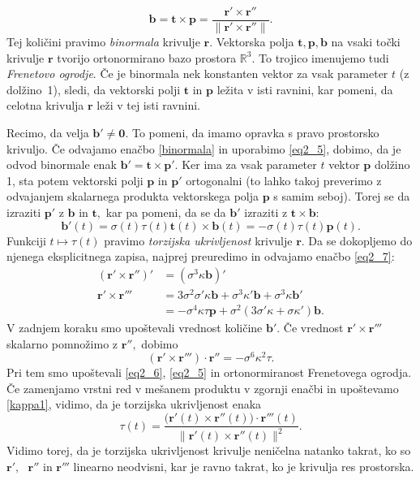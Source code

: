 \documentclass[12pt,a4paper,twoside]{article}
\theoremstyle{definition} %
\theoremstyle{plain} %
\theoremstyle{primerstyle}
\numberwithin{equation}{section}  %
\newcommand{\R}{\mathbb R}
\newcommand{\tV}{\mathbf{t}}
\newcommand{\bV}{\mathbf{b}}
\newcommand{\pV}{\mathbf{p}}
\newcommand{\rV}{\mathbf{r}}
\begin{document}
\begin{equation}
	\label{binormala}
	\bV=\tV \times \pV=\frac{\rV'\times \rV''}{\lVert \rV'\times \rV'' \rVert}.
\end{equation}
Tej količini pravimo \textit{binormala} krivulje $\rV.$ Vektorska polja $\tV,\mathbf{ p}, \mathbf{ b}$ na vsaki točki krivulje $\rV$ tvorijo ortonormirano bazo prostora $\R^3.$ To trojico imenujemo tudi \textit{Frenetovo ogrodje}. Če je binormala nek konstanten vektor za vsak parameter $t$ (z dolžino~1), sledi, da vektorski polji $\tV$ in $\pV$ ležita v isti ravnini, kar pomeni, da celotna krivulja $\rV$ leži v tej isti ravnini.

Recimo, da velja $\bV' \neq \bm{0}.$ To pomeni, da imamo opravka s pravo prostorsko krivuljo. Če odvajamo enačbo \eqref{binormala} in uporabimo \eqref{eq2_5}, dobimo, da je odvod binormale enak $\bV'=\tV \times \pV'.$ Ker ima za vsak parameter $t$ vektor $\pV$ dolžino 1, sta potem vektorski polji $\pV$ in $\pV'$ ortogonalni (to lahko takoj preverimo z odvajanjem skalarnega produkta vektorskega polja $\pV$ s samim seboj). Torej se da izraziti $\pV'$ z $\bV$ in $\tV,$ kar pa pomeni, da se da $\bV'$ izraziti z $\tV \times \bV$:
\begin{equation}
	\label{eq2_11}
	\bV'(t)=\sigma(t)\tau(t)\tV(t)\times \bV(t)=-\sigma(t)\tau(t)\pV(t).
\end{equation}
Funkciji $t\mapsto\tau(t)$ pravimo \textit{torzijska ukrivljenost} krivulje $\rV.$ Da se dokopljemo do njenega eksplicitnega zapisa, najprej preuredimo in odvajamo enačbo \eqref{eq2_7}:
\begin{align*}
	(\rV' \times \rV'')'&=(\sigma^3\kappa \bV)'\\
	\rV' \times \rV''' &= 3\sigma^2\sigma'\kappa\bV+\sigma^3\kappa'\bV+\sigma^3\kappa\bV'\\
	&=-\sigma^4\kappa\tau\pV+\sigma^2(3\sigma'\kappa+\sigma\kappa')\bV.
\end{align*}
V zadnjem koraku smo upoštevali vrednost količine $\bV'.$ Če vrednost $\rV'\times \rV'''$ skalarno pomnožimo z $\rV'',$ dobimo
\begin{equation}
	(\rV'\times\rV''')\cdot\rV''=-\sigma^6\kappa^2\tau.
\end{equation}
Pri tem smo upoštevali \eqref{eq2_6}, \eqref{eq2_5} in ortonormiranost Frenetovega ogrodja. Če zamenjamo vrstni red v mešanem produktu v zgornji enačbi in upoštevamo \eqref{kappa1}, vidimo, da je torzijska ukrivljenost enaka
\begin{equation}
	\label{tau1}
	\tau(t)=\frac{\big(\rV'(t)\times\rV''(t)\big)\cdot\rV'''(t)}{\lVert \rV'(t)\times \rV''(t) \rVert^2}.
\end{equation}
Vidimo torej, da je torzijska ukrivljenost krivulje neničelna natanko takrat, ko so $\rV', \text{ } \rV''$ in $\rV'''$ linearno neodvisni, kar je ravno takrat, ko je krivulja res prostorska.
\end{document}
